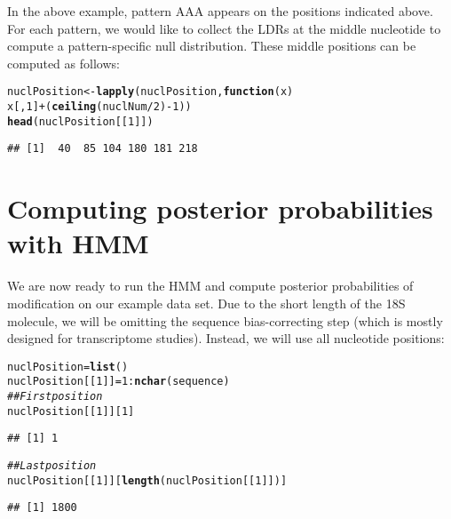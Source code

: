\documentclass{article}\usepackage[]{graphicx}\usepackage[]{color}
\makeatletter
\newcommand{\hlnum}[1]{\textcolor[rgb]{0.686,0.059,0.569}{#1}}%
\newcommand{\hlcom}[1]{\textcolor[rgb]{0.678,0.584,0.686}{\textit{#1}}}%
\newcommand{\hlopt}[1]{\textcolor[rgb]{0,0,0}{#1}}%
\newcommand{\hlstd}[1]{\textcolor[rgb]{0.345,0.345,0.345}{#1}}%
\newcommand{\hlkwa}[1]{\textcolor[rgb]{0.161,0.373,0.58}{\textbf{#1}}}%
\newcommand{\hlkwb}[1]{\textcolor[rgb]{0.69,0.353,0.396}{#1}}%
\newcommand{\hlkwc}[1]{\textcolor[rgb]{0.333,0.667,0.333}{#1}}%
\newcommand{\hlkwd}[1]{\textcolor[rgb]{0.737,0.353,0.396}{\textbf{#1}}}%
\newenvironment{kframe}{%
 \def\at@end@of@kframe{}%
 \ifinner\ifhmode%
  \def\at@end@of@kframe{\end{minipage}}%
  \begin{minipage}{\columnwidth}%
 \fi\fi%
 \def\FrameCommand##1{\hskip\@totalleftmargin \hskip-\fboxsep
 \colorbox{shadecolor}{##1}\hskip-\fboxsep
     \hskip-\linewidth \hskip-\@totalleftmargin \hskip\columnwidth}%
 \MakeFramed {\advance\hsize-\width
   \@totalleftmargin\z@ \linewidth\hsize
   \@setminipage}}%
 {\par\unskip\endMakeFramed%
 \at@end@of@kframe}
\newenvironment{knitrout}{}{} %
\makeatother
\begin{document}
In the above example, pattern AAA appears on the positions
indicated above. For each pattern, we would like to collect the LDRs at the
middle nucleotide to compute a pattern-specific null distribution. These middle
positions can be computed as follows:

\begin{knitrout}
\color{fgcolor}\begin{kframe}
\begin{alltt}
\hlstd{nuclPosition} \hlkwb{<-} \hlkwd{lapply}\hlstd{(nuclPosition,} \hlkwa{function}\hlstd{(}\hlkwc{x}\hlstd{)}
                \hlstd{x[,} \hlnum{1}\hlstd{]} \hlopt{+} \hlstd{(}\hlkwd{ceiling}\hlstd{(nuclNum} \hlopt{/} \hlnum{2}\hlstd{)} \hlopt{-} \hlnum{1}\hlstd{))}
\hlkwd{head}\hlstd{(nuclPosition[[}\hlnum{1}\hlstd{]])}
\end{alltt}
\begin{verbatim}
## [1]  40  85 104 180 181 218
\end{verbatim}
\end{kframe}
\end{knitrout}

\section{Computing posterior probabilities with HMM}

We are now ready to run the HMM and compute posterior probabilities of
modification on our example data set. Due to the short length of the 18S
molecule, we will be omitting the sequence bias-correcting step (which is mostly
designed for transcriptome studies). Instead, we will use all nucleotide
positions:

\begin{knitrout}
\color{fgcolor}\begin{kframe}
\begin{alltt}
\hlstd{nuclPosition} \hlkwb{=} \hlkwd{list}\hlstd{()}
\hlstd{nuclPosition[[}\hlnum{1}\hlstd{]]} \hlkwb{=} \hlnum{1}\hlopt{:}\hlkwd{nchar}\hlstd{(sequence)}
\hlcom{## First position}
\hlstd{nuclPosition[[}\hlnum{1}\hlstd{]][}\hlnum{1}\hlstd{]}
\end{alltt}
\begin{verbatim}
## [1] 1
\end{verbatim}
\begin{alltt}
\hlcom{## Last position}
\hlstd{nuclPosition[[}\hlnum{1}\hlstd{]][}\hlkwd{length}\hlstd{(nuclPosition[[}\hlnum{1}\hlstd{]])]}
\end{alltt}
\begin{verbatim}
## [1] 1800
\end{verbatim}
\end{kframe}
\end{knitrout}
\end{document}
